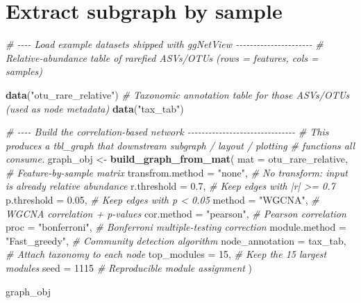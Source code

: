 \documentclass[
]{book}
\newenvironment{Shaded}{\begin{snugshade}}{\end{snugshade}}
\newcommand{\AttributeTok}[1]{\textcolor[rgb]{0.13,0.29,0.53}{#1}}
\newcommand{\CommentTok}[1]{\textcolor[rgb]{0.56,0.35,0.01}{\textit{#1}}}
\newcommand{\DecValTok}[1]{\textcolor[rgb]{0.00,0.00,0.81}{#1}}
\newcommand{\FloatTok}[1]{\textcolor[rgb]{0.00,0.00,0.81}{#1}}
\newcommand{\FunctionTok}[1]{\textcolor[rgb]{0.13,0.29,0.53}{\textbf{#1}}}
\newcommand{\NormalTok}[1]{#1}
\newcommand{\OtherTok}[1]{\textcolor[rgb]{0.56,0.35,0.01}{#1}}
\newcommand{\StringTok}[1]{\textcolor[rgb]{0.31,0.60,0.02}{#1}}
\begin{document}
\section{Extract subgraph by sample}\label{extract-subgraph-by-sample}

\begin{Shaded}
\begin{Highlighting}[]
\CommentTok{\# {-}{-}{-}{-} Load example datasets shipped with ggNetView {-}{-}{-}{-}{-}{-}{-}{-}{-}{-}{-}{-}{-}{-}{-}{-}{-}{-}{-}{-}{-}{-}}
\CommentTok{\# Relative{-}abundance table of rarefied ASVs/OTUs (rows = features, cols = samples)}

\FunctionTok{data}\NormalTok{(}\StringTok{"otu\_rare\_relative"}\NormalTok{)}
\CommentTok{\# Taxonomic annotation table for those ASVs/OTUs (used as node metadata)}
\FunctionTok{data}\NormalTok{(}\StringTok{"tax\_tab"}\NormalTok{)}

\CommentTok{\# {-}{-}{-}{-} Build the correlation{-}based network {-}{-}{-}{-}{-}{-}{-}{-}{-}{-}{-}{-}{-}{-}{-}{-}{-}{-}{-}{-}{-}{-}{-}{-}{-}{-}{-}{-}{-}{-}{-}}
\CommentTok{\# This produces a tbl\_graph that downstream subgraph / layout / plotting}
\CommentTok{\# functions all consume.}
\NormalTok{graph\_obj }\OtherTok{\textless{}{-}} \FunctionTok{build\_graph\_from\_mat}\NormalTok{(}
  \AttributeTok{mat              =}\NormalTok{ otu\_rare\_relative, }\CommentTok{\# Feature{-}by{-}sample matrix}
  \AttributeTok{transfrom.method =} \StringTok{"none"}\NormalTok{,            }\CommentTok{\# No transform: input is already relative abundance}
  \AttributeTok{r.threshold      =} \FloatTok{0.7}\NormalTok{,               }\CommentTok{\# Keep edges with |r| \textgreater{}= 0.7}
  \AttributeTok{p.threshold      =} \FloatTok{0.05}\NormalTok{,              }\CommentTok{\# Keep edges with p \textless{} 0.05}
  \AttributeTok{method           =} \StringTok{"WGCNA"}\NormalTok{,           }\CommentTok{\# WGCNA correlation + p{-}values}
  \AttributeTok{cor.method       =} \StringTok{"pearson"}\NormalTok{,         }\CommentTok{\# Pearson correlation}
  \AttributeTok{proc             =} \StringTok{"bonferroni"}\NormalTok{,      }\CommentTok{\# Bonferroni multiple{-}testing correction}
  \AttributeTok{module.method    =} \StringTok{"Fast\_greedy"}\NormalTok{,     }\CommentTok{\# Community detection algorithm}
  \AttributeTok{node\_annotation  =}\NormalTok{ tax\_tab,           }\CommentTok{\# Attach taxonomy to each node}
  \AttributeTok{top\_modules      =} \DecValTok{15}\NormalTok{,                }\CommentTok{\# Keep the 15 largest modules}
  \AttributeTok{seed             =} \DecValTok{1115}               \CommentTok{\# Reproducible module assignment}
\NormalTok{)}

\NormalTok{graph\_obj}
\end{Highlighting}
\end{Shaded}
\end{document}

